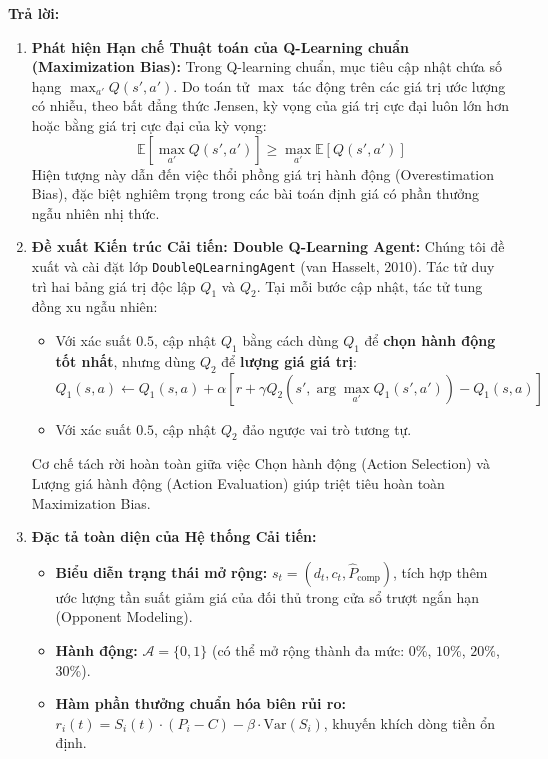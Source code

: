 \documentclass[12pt,a4paper]{article}
\begin{document}
\textbf{Trả lời:}
\begin{enumerate}
    \item \textbf{Phát hiện Hạn chế Thuật toán của Q-Learning chuẩn (Maximization Bias):}
    Trong Q-learning chuẩn, mục tiêu cập nhật chứa số hạng $\max_{a'} Q(s', a')$. Do toán tử $\max$ tác động trên các giá trị ước lượng có nhiễu, theo bất đẳng thức Jensen, kỳ vọng của giá trị cực đại luôn lớn hơn hoặc bằng giá trị cực đại của kỳ vọng:
    \begin{equation}
    \mathbb{E}\left[ \max_{a'} Q(s', a') \right] \ge \max_{a'} \mathbb{E}\left[ Q(s', a') \right]
    \end{equation}
    Hiện tượng này dẫn đến việc thổi phồng giá trị hành động (Overestimation Bias), đặc biệt nghiêm trọng trong các bài toán định giá có phần thưởng ngẫu nhiên nhị thức.
    \item \textbf{Đề xuất Kiến trúc Cải tiến: Double Q-Learning Agent:}
    Chúng tôi đề xuất và cài đặt lớp \texttt{DoubleQLearningAgent} (van Hasselt, 2010). Tác tử duy trì hai bảng giá trị độc lập $Q_1$ và $Q_2$. Tại mỗi bước cập nhật, tác tử tung đồng xu ngẫu nhiên:
    \begin{itemize}
        \item Với xác suất $0.5$, cập nhật $Q_1$ bằng cách dùng $Q_1$ để \textbf{chọn hành động tốt nhất}, nhưng dùng $Q_2$ để \textbf{lượng giá giá trị}:
        \begin{equation}
        Q_1(s, a) \leftarrow Q_1(s, a) + \alpha \left[ r + \gamma Q_2\left(s', \arg\max_{a'} Q_1(s', a')\right) - Q_1(s, a) \right]
        \end{equation}
        \item Với xác suất $0.5$, cập nhật $Q_2$ đảo ngược vai trò tương tự.
    \end{itemize}
    Cơ chế tách rời hoàn toàn giữa việc Chọn hành động (Action Selection) và Lượng giá hành động (Action Evaluation) giúp triệt tiêu hoàn toàn Maximization Bias.
    \item \textbf{Đặc tả toàn diện của Hệ thống Cải tiến:}
    \begin{itemize}
        \item \textbf{Biểu diễn trạng thái mở rộng:} $s_t = (d_t, c_t, \hat{P}_{\text{comp}})$, tích hợp thêm ước lượng tần suất giảm giá của đối thủ trong cửa sổ trượt ngắn hạn (Opponent Modeling).
        \item \textbf{Hành động:} $\mathcal{A} = \{0, 1\}$ (có thể mở rộng thành đa mức: $0\%$, $10\%$, $20\%$, $30\%$).
        \item \textbf{Hàm phần thưởng chuẩn hóa biên rủi ro:} $r_i(t) = S_i(t) \cdot (P_i - C) - \beta \cdot \text{Var}(S_i)$, khuyến khích dòng tiền ổn định.

\end{itemize}
\end{enumerate}
\end{document}
